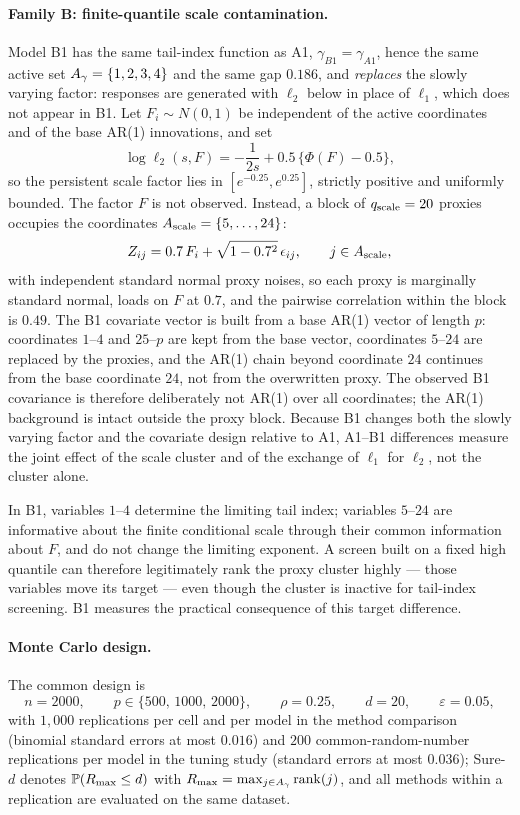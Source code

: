 \paragraph{Family B: finite-quantile scale contamination.}
Model B1 has the same tail-index function as A1,
$\gamma_{B1}=\gamma_{A1}$, hence the same active set
$A_\gamma=\{1,2,3,4\}$ and the same gap $0.186$, and \emph{replaces}
the slowly varying factor: responses are generated with $\ell_2$ below
in place of $\ell_1$, which does not appear in B1. Let
$F_i\sim N(0,1)$ be independent of the active coordinates and of the
base AR(1) innovations, and set
\[
 \log\ell_2(s,F)=-\frac1{2s}+0.5\,\bigl\{\Phi(F)-0.5\bigr\},
\]
so the persistent scale factor lies in $[e^{-0.25},e^{0.25}]$, strictly
positive and uniformly bounded. The factor $F$ is not observed. Instead,
a block of $q_{\rm scale}=20$ proxies occupies the coordinates
$A_{\rm scale}=\{5,\ldots,24\}$:
\[
 Z_{ij}=0.7\,F_i+\sqrt{1-0.7^2}\,\epsilon_{ij},
 \qquad j\in A_{\rm scale},
\]
with independent standard normal proxy noises, so each proxy is
marginally standard normal, loads on $F$ at $0.7$, and the pairwise
correlation within the block is $0.49$. The B1 covariate vector is
built from a base AR(1) vector of length $p$: coordinates $1$--$4$ and
$25$--$p$ are kept from the base vector, coordinates $5$--$24$ are
replaced by the proxies, and the AR(1) chain beyond coordinate $24$
continues from the base coordinate $24$, not from the overwritten
proxy. The observed B1 covariance is therefore deliberately not AR(1)
over all coordinates; the AR(1) background is intact outside the proxy
block. Because B1 changes both the slowly varying factor and the
covariate design relative to A1, A1--B1 differences measure the joint
effect of the scale cluster and of the exchange of $\ell_1$ for
$\ell_2$, not the cluster alone.

In B1, variables $1$--$4$ determine the limiting tail index; variables
$5$--$24$ are informative about the finite conditional scale through
their common information about $F$, and do not change the limiting
exponent. A screen built on a fixed high quantile can therefore
legitimately rank the proxy cluster highly --- those variables move its
target --- even though the cluster is inactive for tail-index
screening. B1 measures the practical consequence of this target
difference. 

\paragraph{Monte Carlo design.}
The common design is
\[
 n=2000,\qquad p\in\{500,\,1000,\,2000\},\qquad \rho=0.25,
 \qquad d=20,\qquad \varepsilon=0.05,
\]
with $1{,}000$ replications per cell and per model in the method
comparison (binomial standard errors at most $0.016$) and $200$
common-random-number replications per model in the tuning study
(standard errors at most $0.036$); Sure-$d$ denotes
$\mathbb P(R_{\max}\le d)$ with $R_{\max}=\max_{j\in A_\gamma}\mathrm{rank}(j)$,
and all methods within a replication are evaluated on the same dataset.


